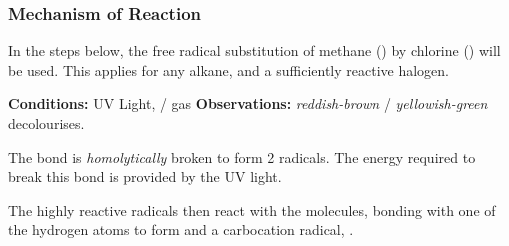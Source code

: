 	\subsubsection{Mechanism of Reaction}

		In the steps below, the free radical substitution of methane () by chlorine () will be used. This applies
		for any alkane, and a sufficiently reactive halogen.

		\vspace{1.5em}

		\vbox{\textbf{Conditions:} \tabto{35mm}UV Light,  /  gas}
		\vbox{\textbf{Observations:} \tabto{35mm}\textit{\color{Mahogany}reddish-brown}  / \textit{\color{YellowGreen}yellowish-green}  decolourises.}


			The \ch{\chlorine-\chlorine} bond is \textit{homolytically} broken to form 2 \ch{\chlorine} radicals.
			The energy required to break this bond is provided by the UV light.




			The highly reactive \ch{\chlorine} radicals then react with the  molecules, bonding with one of the
			hydrogen atoms to form  and a carbocation radical, .



